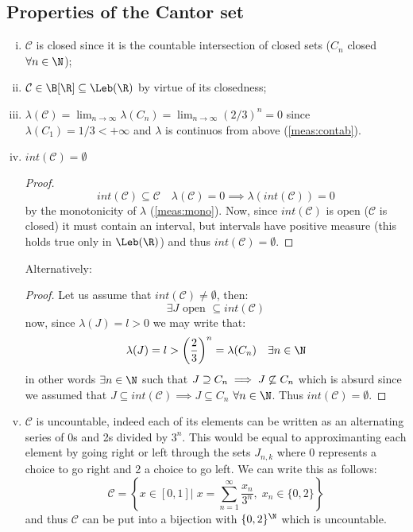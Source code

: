 \subsection{Properties of the Cantor set}
\begin{enumerate}[i)]
    \item $\mathcal{C}$ is closed since it is the countable intersection of closed sets ($C_n$ closed $\forall n\in\N$);
    \item $\mathcal{C} \in \B[\R] \subseteq \Leb(\R)$ by virtue of its closedness;
    \item $\lambda(\mathcal{C}) = \lim_{n\to\infty} \lambda(C_n) = \lim_{n\to\infty} (2/3)^n = 0$ since $\lambda(C_1) = 1/3 < +\infty$ and $\lambda$ is continuos from above (\ref{meas:contab}).
    \item $int(\mathcal{C}) = \emptyset$ \\
        \begin{proof}
            \[
            int (\mathcal{C}) \subseteq \mathcal{C} \quad \lambda(\mathcal{C}) = 0 \implies \lambda(int(\mathcal{C})) = 0    
            \]
            by the monotonicity of $\lambda$ (\ref{meas:mono}). Now, since $int(\mathcal{C})$ is open ($\mathcal{C}$ is closed) it must contain an interval, but intervals have positive measure (this holds true only in $\Leb(\R)$) and thus $int(\mathcal{C}) = \emptyset$.
        \end{proof}
        Alternatively:
        \begin{proof}
            Let us assume that $int(\mathcal{C}) \neq \emptyset$, then:
            \[
                \exists J \text{ open } \subseteq int(\mathcal{C})    
            \]
            now, since $\lambda(J)=l >0$ we may write that:
            \[
                \lambda(J) = l > \left( \frac{2}{3} \right)^n = \lambda(C_n) \quad \exists n \in\N 
            \]
            in other words $\exists n \in\N$ such that $J \supseteq C_n \implies J \centernot \subseteq C_n$ which is absurd since we assumed that $J \subseteq int (\mathcal{C}) \implies J \subseteq C_n$ $\forall n\in\N$. Thus $int(\mathcal{C}) = \emptyset$.
        \end{proof}
    \item $\mathcal{C}$ is uncountable, indeed each of its elements can be written as an alternating series of 0s and 2s divided by $3^n$. This would be equal to approximanting each element by going right or left through the sets $J_{n,k}$ where 0 represents a choice to go right and 2 a choice to go left. We can write this as follows:
        \[
            \mathcal{C} = \left\{ x\in [0,1] | \; x = \sum_{n=1}^\infty \frac{x_n}{3^n}, \; x_n \in \{0,2\} \right\}
        \]
        and thus $\mathcal{C}$ can be put into a bijection with $\{0,2\}^\N$ which is uncountable.
\end{enumerate}

